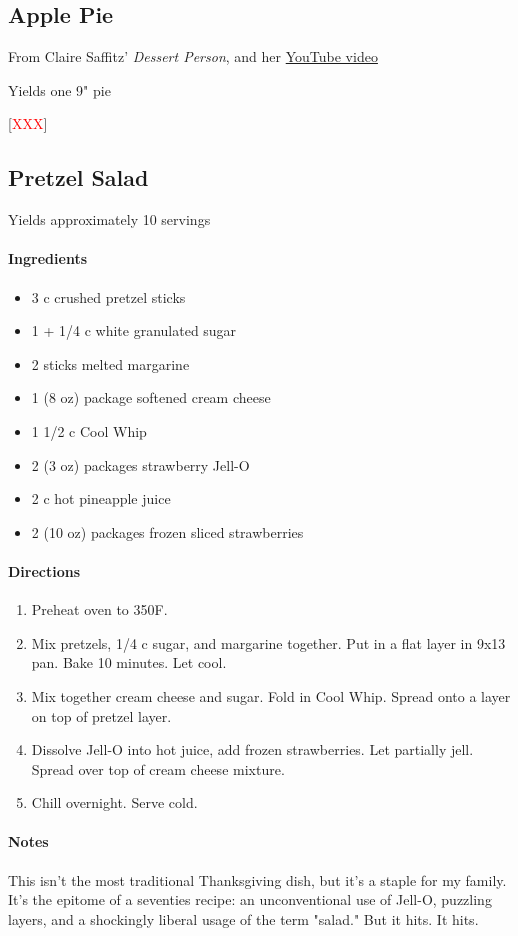 \documentclass[12pt]{article}
\newcommand{\TODO}{[\textcolor{red}{XXX}]}
\newenvironment*{ingredients}
	{
		\paragraph*{Ingredients}
		\begin{itemize}
	}
	{
		\end{itemize}
	}
\newenvironment*{directions}
	{
		\paragraph*{Directions}
		\begin{enumerate}
	}
	{
		\end{enumerate}
	}
\newenvironment*{notes}
	{
		\paragraph*{Notes}
		\begin{adjustwidth}{1cm}{}
	}
	{
		\end{adjustwidth}
	}
\begin{document}
	\newpage
	
	\subsection{Apple Pie}
	From Claire Saffitz' \textit{Dessert Person}, and her \href{https://www.youtube.com/watch?v=7PHSWxGLSEE}{YouTube video}
	
	Yields one 9" pie
	
	\TODO
	
	\newpage
	
	\subsection{Pretzel Salad}
	Yields approximately 10 servings
	
	\begin{ingredients}
		\item 3 c crushed pretzel sticks
		\item 1 + 1/4 c white granulated sugar
		\item 2 sticks melted margarine
		\item 1 (8 oz) package softened cream cheese
		\item 1 1/2 c Cool Whip
		\item 2 (3 oz) packages strawberry Jell-O
		\item 2 c hot pineapple juice
		\item 2 (10 oz) packages frozen sliced strawberries
	\end{ingredients}
	
	\begin{directions}
		\item Preheat oven to 350F.
		\item Mix pretzels, 1/4 c sugar, and margarine together. Put in a flat layer in 9x13 pan. Bake 10 minutes. Let cool.
		\item Mix together cream cheese and sugar. Fold in Cool Whip. Spread onto a layer on top of pretzel layer.
		\item Dissolve Jell-O into hot juice, add frozen strawberries. Let partially jell. Spread over top of cream cheese mixture.
		\item Chill overnight. Serve cold.
	\end{directions}
	
	\begin{notes}
		This isn't the most traditional Thanksgiving dish, but it's a staple for my family. It's the epitome of a seventies recipe: an unconventional use of Jell-O, puzzling layers, and a shockingly liberal usage of the term "salad." But it hits. It hits.
	\end{notes}
	
\end{document}
